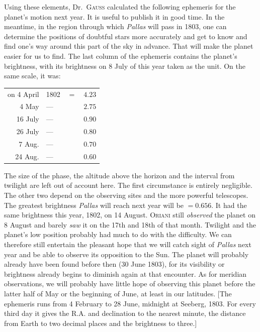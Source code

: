 Using these elements, Dr.\ \textsc{Gauss} calculated the following ephemeris for the planet’s motion next year. It is useful to publish it in good time. In the meantime, in the region through which \textit{Pallas} will pass in 1803, one can determine the positions of doubtful stars more accurately and get to know and find one’s way around this part of the sky in advance. That will make the planet easier for us to find. The last column of the ephemeris contains the planet’s brightness, with its brightness on 8 July of this year taken as the unit. On the same scale, it was:
\begin{center}
\begin{tabular}{r l l r}
on 4 April&1802&$=$&$4.23$\\
4 May&—&&$2.75$\\
16 July&—&&$0.90$\\
26 July&—&&$0.80$\\
7 Aug.&—&&$0.70$\\
24 Aug.&—&&$0.60$
\end{tabular}
\end{center}
The size of the phase, the altitude above the horizon and the interval from twilight are left out of account here. The first circumstance is entirely negligible. The other two depend on the observing sites and the more powerful telescopes. The greatest brightness \textit{Pallas} will reach next year will be $=0.656$. It had the same brightness this year, 1802, on 14 August. \textsc{Oriani} still \textit{observed} the planet on 8 August and barely \textit{saw} it on the 17th and 18th of that month. Twilight and the planet’s low position probably had much to do with the difficulty. We can therefore still entertain the pleasant hope that we will catch sight of \textit{Pallas} next year and be able to observe its opposition to the Sun. The planet will probably already have been found before then (30 June 1803), for its visibility or brightness already begins to diminish again at that encounter. As for meridian observations, we will probably have little hope of observing this planet before the latter half of May or the beginning of June, at least in our latitudes. [The ephemeris runs from 4 February to 28 June, midnight at Seeberg, 1803. For every third day it gives the R.A. and declination to the nearest minute, the distance from Earth to two decimal places and the brightness to three.]

